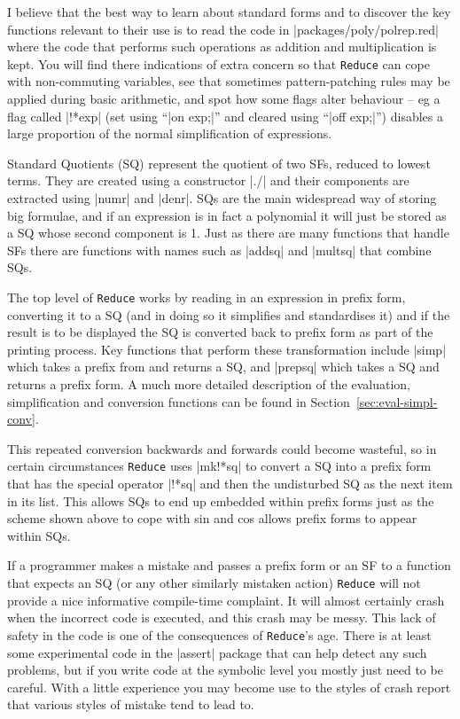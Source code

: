 \documentclass[12pt,twoside,openright]{memoir}
\newcommand{\reduce}{\texttt{Reduce}\xspace}
\begin{document}
I believe that the best way to learn about standard forms and to discover the
key functions relevant to their use is to read the code in
|packages/poly/polrep.red| where the code that performs such operations as
addition and multiplication is kept. You will find there indications of
extra concern so that \reduce can cope with non-commuting variables, see that
sometimes pattern-patching rules may be applied during basic arithmetic, and
spot how some flags alter behaviour -- eg a flag called |!*exp| (set using
``|on exp;|'' and cleared using ``|off exp;|'') disables a large proportion
of the normal simplification of expressions.

Standard Quotients (SQ) represent the quotient of two SFs, reduced to lowest
terms. They are created using a constructor |./| and their components are
extracted using |numr| and |denr|. SQs are the main widespread way of
storing big formulae, and if an expression is in fact a polynomial it will just
be stored as a SQ whose second component is 1. Just as there are many functions
that handle SFs there are functions with names such as |addsq| and |multsq|
that combine SQs.

The top level of \reduce works by reading in an expression in prefix form,
converting it to a SQ (and in doing so it simplifies and standardises it) and
if the result is to be displayed the SQ is converted back to prefix form as
part of the printing process. Key functions that perform these transformation
include |simp| which takes a prefix from and returns a SQ, and |prepsq| which
takes a SQ and returns a prefix form.  A much more detailed description of the
evaluation, simplification and conversion functions can be found in
Section~\ref{sec:eval-simpl-conv}.

This repeated conversion backwards and forwards could become wasteful, so in
certain circumstances \reduce uses |mk!*sq| to convert a SQ into a prefix
form that has the special operator |!*sq| and then the undisturbed SQ as
the next item in its list. This allows SQs to end up embedded within prefix
forms just as the scheme shown above to cope with sin and cos allows prefix
forms to appear within SQs.

If a programmer makes a mistake and passes a prefix form or an SF to a function
that expects an SQ (or any other similarly mistaken action) \reduce will not
provide a nice informative compile-time complaint. It will almost certainly
crash when the incorrect code is executed, and this crash may be messy. This
lack of safety in the code is one of the consequences of \reduce's age.
There is at least some experimental code  in the |assert| package that can
help detect any such problems, but if you write code at the symbolic level
you mostly just need to be careful. With a little experience you may become
use to the styles of crash report that various styles of mistake tend to
lead to.
\end{document}
